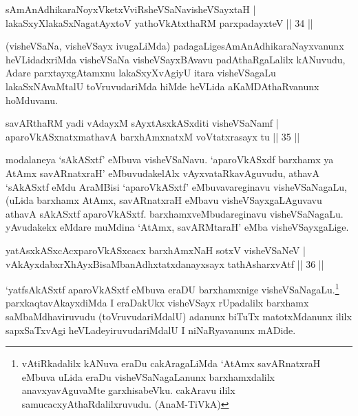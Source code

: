 
\begin{shl}
sAmAnAdhikaraNoyxVketxVviRsheVSaNavisheVSayxtaH |\\
lakaSxyXlakaSxNagatAyx\s toV yathoVkAtxthaRM parxpadayxteV \hfill || 34 ||
\end{shl}

\begin{artha}
(visheVSaNa, visheVSayx ivugaLiMda) padagaLige\footnotemark[1]sAmAnAdhikaraNayxvanunx heVLidadxriMda visheVSaNa visheVSayxBAvavu padAthaRgaLalilx kANuvudu, Adare parxtayxgAtamxnu lakaSxyXvAgiyU itara visheVSagaLu lakaSxNAvaMtalU toVruvudariMda hiMde heVLida aKaMDAthaRvanunx hoMduvanu.
\end{artha}


\begin{shl}
savARthaRM yadi vA\s \s dayxM sAyxtAsxkASxditi visheVSaNamf |\\
aparoVkASxnatxmathavA barxhAmxnatxM voVtatxrasayx tu \hfill || 35 ||
\end{shl}

\begin{artha}
modalaneya `sAkASxtf' eMbuva visheVSaNavu. `aparoVkASxdf barxhamx ya AtAmx savARnatxraH' eMbuvudakelAlx vAyxvataRkavAguvudu, athavA `sAkASxtf eMdu AraMBisi `aparoVkASxtf' eMbuvavareginavu visheVSaNagaLu, (uLida barxhamx AtAmx, savARnatxraH eMbavu visheVSayxgaLAguvavu athavA sAkASxtf aparoVkASxtf. barxhamxveMbudareginavu visheVSaNagaLu. yAvudakekx eMdare muMdina `AtAmx, savARMtaraH' eMba visheVSayxgaLige.
\end{artha}


\begin{shl}
yatAsxkASxcAcxparoVkASxcacx barxhAmxNaH sotxV visheVSaNeV |\\
vAkAyxdabxrXhAyxBisaMbanAdhxtatxdanayxsayx tathA\s sharxvAtf \hfill || 36 ||
\end{shl}

\begin{artha}
`yatfsAkASxtf aparoVkASxtf eMbuva eraDU barxhamxnige visheVSaNagaLu.\footnote{vAtiRkadalilx kANuva eraDu cakAragaLiMda `AtAmx savARnatxraH eMbuva uLida eraDu visheVSaNagaLanunx barxhamxdalilx anavxyavAguvaMte garxhisabeVku. cakAravu ililx samucacxyAthaRdalilxruvudu. (AnaM-TiVkA)} parxkaqtavAkayxdiMda I eraDakUkx visheVSayx rUpadalilx barxhamx saMbaMdhaviruvudu (toVruvudariMdalU) adanunx biTuTx matotxMdanunx ililx sapxSaTxvAgi heVLadeyiruvudariMdalU I niNaRyavanunx mADide.
\end{artha}

